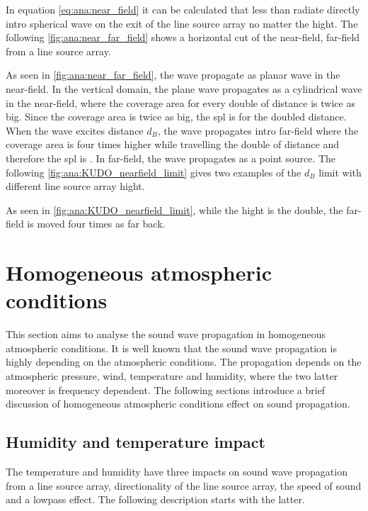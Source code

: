 In equation \autoref{eq:ana:near_field} it can be calculated that less than  radiate directly intro spherical wave on the exit of the line source array no matter the hight. The following \autoref{fig:ana:near_far_field} shows a horizontal cut of the near-field, far-field from a line source array. 


As seen in \autoref{fig:ana:near_far_field}, the wave propagate as planar wave in the near-field. In the vertical domain, the plane wave propagates as a cylindrical wave in the near-field, where the coverage area for every double of distance is twice as big. Since the coverage area is twice as big, the \gls{spl} is  for the doubled distance. When the wave excites distance $d_B$, the wave propagates intro far-field where the coverage area is four times higher while travelling the double of distance and therefore the \gls{spl} is . In far-field, the wave propagates as a point source. The following \autoref{fig:ana:KUDO_nearfield_limit} gives two examples of the $d_B$ limit with different line source array hight.


As seen in \autoref{fig:ana:KUDO_nearfield_limit}, while the hight is the double, the far-field is moved four times as far back.


\section{Homogeneous atmospheric conditions}\label{sec:ana:hom_ats_con}
This section aims to analyse the sound wave propagation in homogeneous atmospheric conditions. It is well known that the sound wave propagation is highly depending on the atmospheric conditions. The propagation depends on the atmospheric pressure, wind, temperature and humidity, where the two latter moreover is frequency dependent. The following sections introduce a brief discussion of homogeneous atmospheric conditions effect on sound propagation.


\subsection{Humidity and temperature impact}\label{sec:ana:hu_temp}
The temperature and humidity have three impacts on sound wave propagation from a line source array, directionality of the line source array, the speed of sound and a lowpass effect. The following description starts with the latter. 

